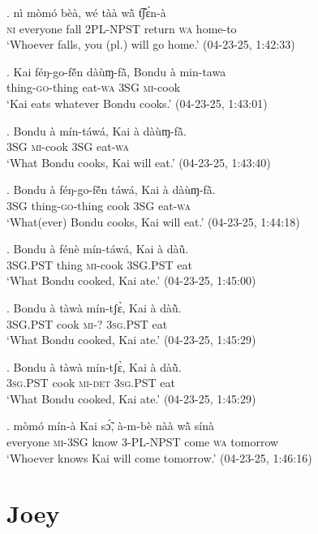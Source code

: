 \documentclass{assets/fieldnotes}
\begin{document}
\exg. nì mòmó bèà, wé tàà wã̀ t͡ʃɛ́n-à\\
\textsc{ni} everyone fall \textsc{2PL-NPST} return \textsc{wa} home-to\\
`Whoever falls, you (pl.) will go home.’ \hfill{(04-23-25, 1:42:33)}

\exg. Kai féŋ-go-fẽ́n dàùɱ-fã̀, Bondu à min-tawa\\
{} thing-\textsc{go}-thing eat-\textsc{wa} {} \textsc{3SG} \textsc{mi}-cook\\
`Kai eats whatever Bondu cooks.’ \hfill{(04-23-25, 1:43:01)}

\exg. Bondu à mín-táwá, Kai à dàùɱ-fã̀.\\
{} \textsc{3SG} \textsc{mi}-cook {} \textsc{3SG} eat-\textsc{wa}\\
`What Bondu cooks, Kai will eat.’ \hfill{(04-23-25, 1:43:40)}

\exg. Bondu à féŋ-go-fẽ́n táwá, Kai à dàùɱ-fã̀.\\
{} \textsc{3SG} thing-\textsc{go}-thing cook {} \textsc{3SG} eat-\textsc{wa}\\
`What(ever) Bondu cooks, Kai will eat.’ \hfill{(04-23-25, 1:44:18)}

\exg. Bondu à fénè mín-táwá, Kai à dàũ̀.\\
{} \textsc{3SG.PST} thing \textsc{mi}-cook {} \textsc{3SG.PST} eat\\
`What Bondu cooked, Kai ate.’ \hfill{(04-23-25, 1:45:00)}

\exg. Bondu à tàwà mín-tʃɛ̀, Kai à dàũ̀.\\
{} \textsc{3SG.PST} cook \textsc{mi-?} {} \textsc{3sg.PST} eat\\
`What Bondu cooked, Kai ate.’ \hfill{(04-23-25, 1:45:29)}\\

\exg. Bondu à tàwà mín-tʃɛ̀, Kai à dàũ̀.\\
{} \textsc{3sg.PST} cook \textsc{mi-det} {} \textsc{3sg.PST} eat\\
`What Bondu cooked, Kai ate.’ \hfill{(04-23-25, 1:45:29)}

\exg. mòmó mín-à Kai sɔ̃́, à-m-bè nàà wã̀ sínà\\
everyone \textsc{mi-3SG} {} know \textsc{3-PL-NPST} come \textsc{wa} tomorrow\\
`Whoever knows Kai will come tomorrow.’ \hfill{(04-23-25, 1:46:16)}

\section{Joey}
\end{document}
